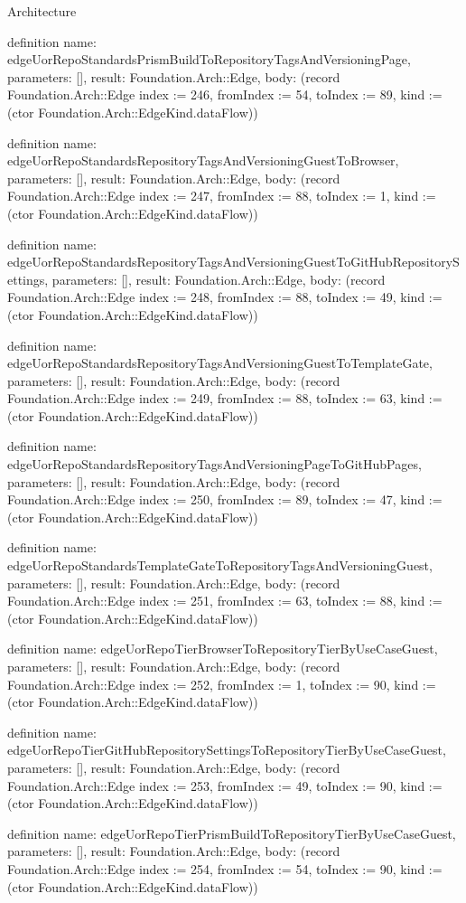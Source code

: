 \begin{lexlean}{Architecture}
\begin{semanticmodule}
definition{
  name: edgeUorRepoStandardsPrismBuildToRepositoryTagsAndVersioningPage,
  parameters: [],
  result: Foundation.Arch::Edge,
  body: (record Foundation.Arch::Edge {index := 246, fromIndex := 54, toIndex := 89, kind := (ctor Foundation.Arch::EdgeKind.dataFlow)})
}

definition{
  name: edgeUorRepoStandardsRepositoryTagsAndVersioningGuestToBrowser,
  parameters: [],
  result: Foundation.Arch::Edge,
  body: (record Foundation.Arch::Edge {index := 247, fromIndex := 88, toIndex := 1, kind := (ctor Foundation.Arch::EdgeKind.dataFlow)})
}

definition{
  name: edgeUorRepoStandardsRepositoryTagsAndVersioningGuestToGitHubRepositorySettings,
  parameters: [],
  result: Foundation.Arch::Edge,
  body: (record Foundation.Arch::Edge {index := 248, fromIndex := 88, toIndex := 49, kind := (ctor Foundation.Arch::EdgeKind.dataFlow)})
}

definition{
  name: edgeUorRepoStandardsRepositoryTagsAndVersioningGuestToTemplateGate,
  parameters: [],
  result: Foundation.Arch::Edge,
  body: (record Foundation.Arch::Edge {index := 249, fromIndex := 88, toIndex := 63, kind := (ctor Foundation.Arch::EdgeKind.dataFlow)})
}

definition{
  name: edgeUorRepoStandardsRepositoryTagsAndVersioningPageToGitHubPages,
  parameters: [],
  result: Foundation.Arch::Edge,
  body: (record Foundation.Arch::Edge {index := 250, fromIndex := 89, toIndex := 47, kind := (ctor Foundation.Arch::EdgeKind.dataFlow)})
}

definition{
  name: edgeUorRepoStandardsTemplateGateToRepositoryTagsAndVersioningGuest,
  parameters: [],
  result: Foundation.Arch::Edge,
  body: (record Foundation.Arch::Edge {index := 251, fromIndex := 63, toIndex := 88, kind := (ctor Foundation.Arch::EdgeKind.dataFlow)})
}

definition{
  name: edgeUorRepoTierBrowserToRepositoryTierByUseCaseGuest,
  parameters: [],
  result: Foundation.Arch::Edge,
  body: (record Foundation.Arch::Edge {index := 252, fromIndex := 1, toIndex := 90, kind := (ctor Foundation.Arch::EdgeKind.dataFlow)})
}

definition{
  name: edgeUorRepoTierGitHubRepositorySettingsToRepositoryTierByUseCaseGuest,
  parameters: [],
  result: Foundation.Arch::Edge,
  body: (record Foundation.Arch::Edge {index := 253, fromIndex := 49, toIndex := 90, kind := (ctor Foundation.Arch::EdgeKind.dataFlow)})
}

definition{
  name: edgeUorRepoTierPrismBuildToRepositoryTierByUseCaseGuest,
  parameters: [],
  result: Foundation.Arch::Edge,
  body: (record Foundation.Arch::Edge {index := 254, fromIndex := 54, toIndex := 90, kind := (ctor Foundation.Arch::EdgeKind.dataFlow)})
}


\end{semanticmodule}
\end{lexlean}
